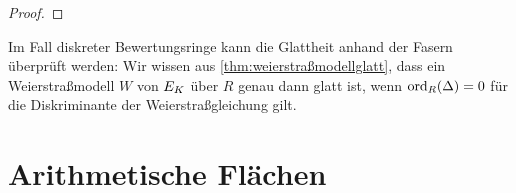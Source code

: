 \documentclass[german]{scrreprt}
\begin{document}
\begin{Korollar}
\begin{proof}
      
  \end{proof}
\end{Korollar}
\begin{Bemerkung}
  Im Fall diskreter Bewertungsringe kann die Glattheit anhand der Fasern
  überprüft werden:
  Wir wissen aus \autoref{thm:weierstraßmodellglatt},
  dass ein Weierstraßmodell $W$ von $E_{K}$ über $R$ genau dann glatt
  ist, wenn $\operatorname{ord}_R(\Delta)=0$ für die Diskriminante der
  Weierstraßgleichung gilt.
\end{Bemerkung}



\chapter{Arithmetische Flächen}
\end{document}
